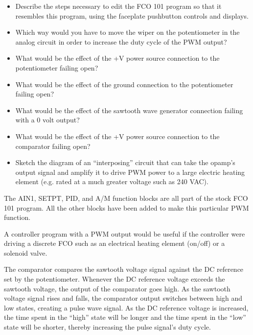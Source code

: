 \begin{itemize}
\item{} Describe the steps necessary to edit the FCO 101 program so that it resembles this program, using the faceplate pushbutton controls and displays.
\item{} Which way would you have to move the wiper on the potentiometer in the analog circuit in order to increase the duty cycle of the PWM output?
\item{} What would be the effect of the +V power source connection to the potentiometer failing open?
\item{} What would be the effect of the ground connection to the potentiometer failing open?
\item{} What would be the effect of the sawtooth wave generator connection failing with a 0 volt output?
\item{} What would be the effect of the +V power source connection to the comparator failing open?
\item{} Sketch the diagram of an ``interposing'' circuit that can take the opamp's output signal and amplify it to drive PWM power to a large electric heating element (e.g. rated at a much greater voltage such as 240 VAC).
\end{itemize}














The AIN1, SETPT, PID, and A/M function blocks are all part of the stock FCO 101 program.  All the other blocks have been added to make this particular PWM function.

\vskip 10pt

A controller program with a PWM output would be useful if the controller were driving a discrete FCO such as an electrical heating element (on/off) or a solenoid valve.

\vskip 10pt

The comparator compares the sawtooth voltage signal against the DC reference set by the potentiometer.  Whenever the DC reference voltage exceeds the sawtooth voltage, the output of the comparator goes high.  As the sawtooth voltage signal rises and falls, the comparator output switches between high and low states, creating a pulse wave signal.  As the DC reference voltage is increased, the time spent in the ``high'' state will be longer and the time spent in the ``low'' state will be shorter, thereby increasing the pulse signal's duty cycle.




